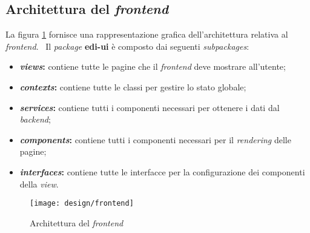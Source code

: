 \newpage
\subsection{Architettura del \emph{\gls{frontend}}}
La figura \ref{fig:fe-design} fornisce una rappresentazione grafica dell'architettura relativa al \emph{\gls{frontend}}. \
Il \emph{package} \textbf{edi-ui} è composto dai seguenti \emph{subpackages}:
\begin{itemize}
  \item \textbf{\emph{views}:} contiene tutte le pagine che il \emph{\gls{frontend}} deve mostrare all'utente;
  \item \textbf{\emph{contexts}:} contiene tutte le classi per gestire lo stato globale;
  \item \textbf{\emph{services}:} contiene tutti i componenti necessari per ottenere i dati dal \emph{\gls{backend}};
  \item \textbf{\emph{components}:} contiene tutti i componenti necessari per il \emph{rendering} delle pagine;
  \item \textbf{\emph{interfaces}:} contiene tutte le interfacce per la configurazione dei componenti della \emph{view}.
\end{itemize}

\begin{figure}[!ht]
  \begin{center}
    \texttt{[image: design/frontend]}
    \caption{Architettura del \emph{\gls{frontend}}}
    \label{fig:fe-design}
  \end{center}
\end{figure}

